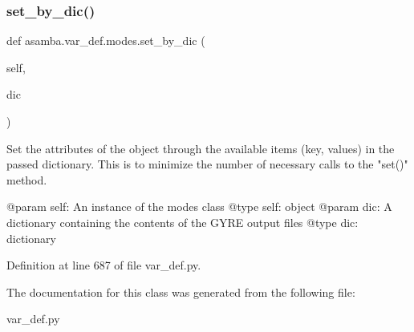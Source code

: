 \subsubsection{\texorpdfstring{set\+\_\+by\+\_\+dic()}{set\_by\_dic()}}
{\footnotesize\ttfamily def asamba.\+var\+\_\+def.\+modes.\+set\+\_\+by\+\_\+dic (\begin{DoxyParamCaption}\item[{}]{self,  }\item[{}]{dic }\end{DoxyParamCaption})}

\begin{DoxyVerb}Set the attributes of the object through the available items (key, values) in the passed 
dictionary. This is to minimize the number of necessary calls to the "set()" method.

@param self: An instance of the modes class
@type self: object
@param dic: A dictionary containing the contents of the GYRE output files
@type dic: dictionary
\end{DoxyVerb}
 

Definition at line 687 of file var\+\_\+def.\+py.



The documentation for this class was generated from the following file\+:\begin{DoxyCompactItemize}
\item 
var\+\_\+def.\+py\end{DoxyCompactItemize}
